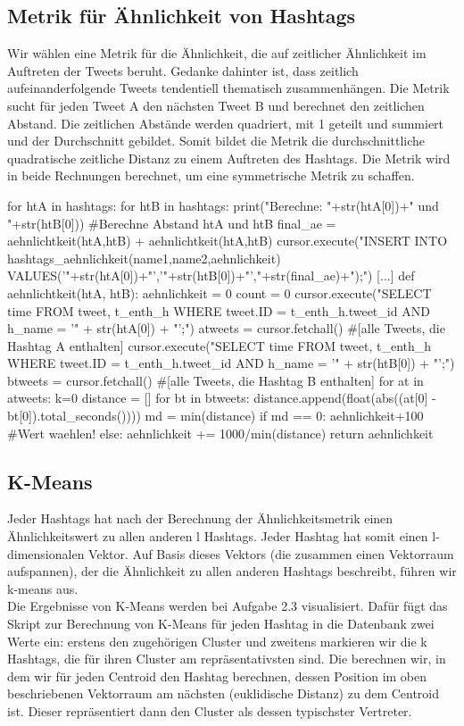 \documentclass[BCOR0mm,fontsize=12pt,paper=a4,final,numbers=noenddot]{scrartcl}
\begin{document}
\subsection{Metrik für Ähnlichkeit von Hashtags}
Wir wählen eine Metrik für die Ähnlichkeit, die auf zeitlicher Ähnlichkeit im Auftreten der Tweets beruht. Gedanke dahinter ist, dass zeitlich aufeinanderfolgende Tweets tendentiell thematisch zusammenhängen. Die Metrik sucht für jeden Tweet A den nächsten Tweet B und berechnet den zeitlichen Abstand. Die zeitlichen Abstände werden quadriert, mit 1 geteilt und summiert und der Durchschnitt gebildet. Somit bildet die Metrik die durchschnittliche quadratische zeitliche Distanz zu einem Auftreten des Hashtags. Die Metrik wird in beide Rechnungen berechnet, um eine symmetrische Metrik zu schaffen.
\begin{python}
[...]
    for htA in hashtags:
        for htB in hashtags:
            print("Berechne: "+str(htA[0])+" und "+str(htB[0]))
        #Berechne Abstand htA und htB 
            final_ae = aehnlichtkeit(htA,htB) + aehnlichtkeit(htA,htB)
            cursor.execute("INSERT INTO hashtags_aehnlichkeit(name1,name2,aehnlichkeit) VALUES('"+str(htA[0])+"','"+str(htB[0])+"',"+str(final_ae)+");")
   [...]
def aehnlichtkeit(htA, htB):
    aehnlichkeit = 0
    count = 0
    cursor.execute("SELECT time FROM tweet, t_enth_h WHERE tweet.ID = t_enth_h.tweet_id AND h_name = '" + str(htA[0]) + "';")
    atweets = cursor.fetchall() #[alle Tweets, die Hashtag A enthalten]
    cursor.execute("SELECT time FROM tweet, t_enth_h WHERE tweet.ID = t_enth_h.tweet_id AND h_name = '" + str(htB[0]) + "';")
    btweets = cursor.fetchall() #[alle Tweets, die Hashtag B enthalten]
    for at in atweets:
        k=0
        distance = []
        for bt in btweets:
            distance.append(float(abs((at[0] - bt[0]).total_seconds())))
        md = min(distance)
        if md == 0:
            aehnlichkeit+100 #Wert waehlen!
        else: 
            aehnlichkeit += 1000/min(distance)
    return aehnlichkeit
\end{python}

\subsection{K-Means}
Jeder Hashtags hat nach der Berechnung der Ähnlichkeitsmetrik einen Ähnlichkeitswert zu allen anderen l Hashtags. Jeder Hashtag hat somit einen l-dimensionalen Vektor. Auf Basis dieses Vektors (die zusammen einen Vektorraum aufspannen), der die Ähnlichkeit zu allen anderen Hashtags beschreibt, führen wir k-means aus.\\
Die Ergebnisse von K-Means werden bei Aufgabe 2.3 visualisiert. Dafür fügt das Skript zur Berechnung von K-Means für jeden Hashtag in die Datenbank zwei Werte ein: erstens den zugehörigen Cluster und zweitens markieren wir die k Hashtags, die für ihren Cluster am repräsentativsten sind. Die berechnen wir, in dem wir für jeden Centroid den Hashtag berechnen, dessen Position im oben beschriebenen Vektorraum am nächsten (euklidische Distanz) zu dem Centroid ist. Dieser repräsentiert dann den Cluster als dessen typischster Vertreter.
\end{document}
